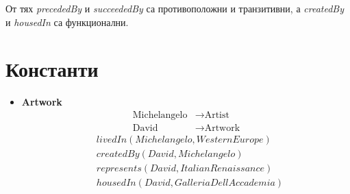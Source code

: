 \documentclass{article}
\begin{document}
От тях \emph{precededBy} и \emph{succeededBy} са противоположни и транзитивни, а \emph{createdBy} и \emph{housedIn} са функционални.

\section*{Константи}
\begin{itemize}
  \item \textbf{Artwork}
    \begin{align*}
      \text{Michelangelo} &\to \text{Artist}\\
      \text{David} &\to \text{Artwork}
    \end{align*}
    \begin{align*}
      &livedIn(Michelangelo, WesternEurope)\\
      &createdBy(David, Michelangelo)\\
      &represents(David, ItalianRenaissance)\\
      &housedIn(David, GalleriaDellAccademia)
    \end{align*}


\end{itemize}
\end{document}
